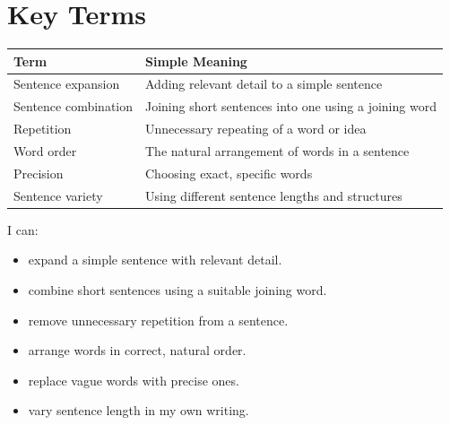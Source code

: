 \section{Key Terms}
\begin{table}[h!]
\centering
\begin{tabular}{|l|l|}
\hline
\textbf{Term} & \textbf{Simple Meaning} \\
\hline
Sentence expansion & Adding relevant detail to a simple sentence \\
Sentence combination & Joining short sentences into one using a joining word \\
Repetition & Unnecessary repeating of a word or idea \\
Word order & The natural arrangement of words in a sentence \\
Precision & Choosing exact, specific words \\
Sentence variety & Using different sentence lengths and structures \\
\hline
\end{tabular}
\end{table}

\begin{selfcheck}
I can:
\begin{itemize}
    \item expand a simple sentence with relevant detail.
    \item combine short sentences using a suitable joining word.
    \item remove unnecessary repetition from a sentence.
    \item arrange words in correct, natural order.
    \item replace vague words with precise ones.
    \item vary sentence length in my own writing.
\end{itemize}
\end{selfcheck}
